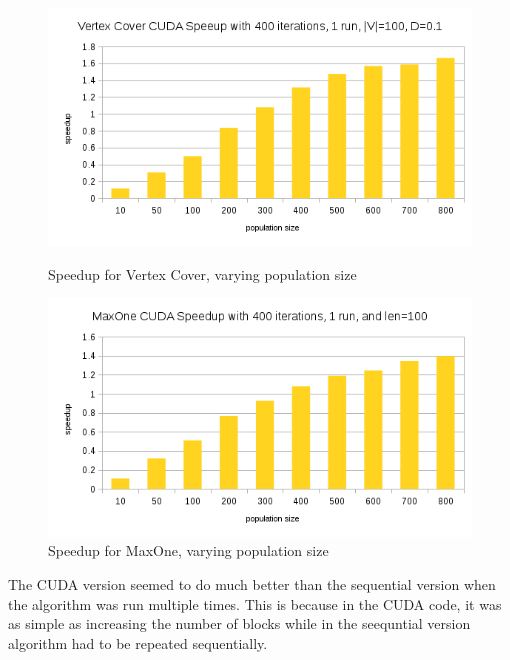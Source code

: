 \documentclass[9pt]{article}
\begin{document}
\begin{figure}[t]
  \centering
  \includegraphics[width=.9\textwidth]{vc_change_pop.png}
  \caption{Speedup for Vertex Cover, varying population size}
  \centering
  \includegraphics[width=.9\textwidth]{maxone_change_pop.png}
  \caption{Speedup for MaxOne, varying population size}
\end{figure}

The CUDA version seemed to do much better than the sequential version when the algorithm was run multiple times. This is because in the CUDA code, it was as simple as increasing the number of blocks while in the seequntial version algorithm had to be repeated sequentially.
\end{document}

